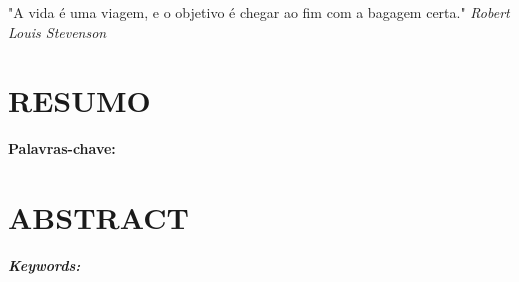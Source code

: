     \null\vfil
    \begin{changemargin}{5cm}{0cm} 
        \justifying
        \hspace{1.5cm} "A vida é uma viagem, e o objetivo é chegar ao fim com a bagagem certa." \textit{Robert Louis Stevenson}
    \end{changemargin}
    \pagebreak

    \section*{\fontsize{12}{14} \selectfont RESUMO}
    

    \vspace{1cm}

    \noindent \textbf{Palavras-chave:} 

    \pagebreak

    \section*{\fontsize{12}{14} \selectfont \center ABSTRACT}
    \textit{}

    \vspace{1cm}
    \noindent \textit{\textbf{Keywords:} }
    \pagebreak

    {%
    \let\oldnumberline\numberline%
    \renewcommand{\numberline}{\figurename~\oldnumberline}%
    \listoffigures%
    }
    \thispagestyle{empty} %
    \pagebreak

    {%
    \let\oldnumberline\numberline%
    \renewcommand{\numberline}{Quadro~\oldnumberline}%
    }
    \pagebreak

    {%
    \let\oldnumberline\numberline%
    \renewcommand{\numberline}{\tablename~\oldnumberline}%
    \listoftables%
    }
    \thispagestyle{empty} %
    \pagebreak

    \printglossary[title=LISTA DE ABREVIATURAS E SIGLAS , type=\acronymtype]
    \pagebreak

    \pagebreak

    \doublespacing
    \tableofcontents
    \onehalfspacing
    \thispagestyle{empty} %
    \pagebreak

    \thispagestyle{empty}
    \null\vfil
    \pagebreak

\pagestyle{myheadings} %